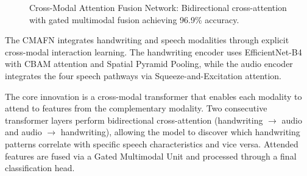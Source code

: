 \documentclass[10pt,conference,letterpaper]{IEEEtran}
\begin{document}
\begin{figure}[h]
\centering
{}
\caption{Cross-Modal Attention Fusion Network: Bidirectional cross-attention with gated multimodal fusion achieving 96.9\% accuracy.}
\label{fig:cmafn}
\end{figure}

The CMAFN integrates handwriting and speech modalities through explicit cross-modal interaction learning. The handwriting encoder uses EfficientNet-B4 with CBAM attention and Spatial Pyramid Pooling, while the audio encoder integrates the four speech pathways via Squeeze-and-Excitation attention.

The core innovation is a cross-modal transformer that enables each modality to attend to features from the complementary modality. Two consecutive transformer layers perform bidirectional cross-attention (handwriting $\rightarrow$ audio and audio $\rightarrow$ handwriting), allowing the model to discover which handwriting patterns correlate with specific speech characteristics and vice versa. Attended features are fused via a Gated Multimodal Unit and processed through a final classification head.
\end{document}
